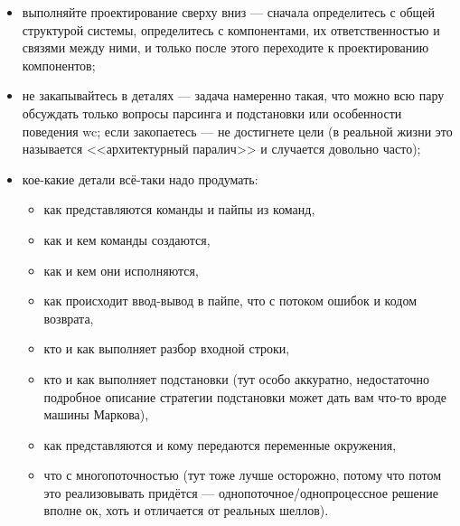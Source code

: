 \documentclass{../../text-style}
\begin{document}
\begin{itemize}
    \item выполняйте проектирование сверху вниз --- сначала определитесь с общей структурой системы, определитесь с компонентами, их ответственностью и связями между ними, и только после этого переходите к проектированию компонентов;
    \item не закапывайтесь в деталях --- задача намеренно такая, что можно всю пару обсуждать только вопросы парсинга и подстановки или особенности поведения wc; если закопаетесь --- не достигнете цели (в реальной жизни это называется <<архитектурный паралич>> и случается довольно часто);
    \item кое-какие детали всё-таки надо продумать:
    \begin{itemize}
        \item как представляются команды и пайпы из команд,
        \item как и кем команды создаются,
        \item как и кем они исполняются,
        \item как происходит ввод-вывод в пайпе, что с потоком ошибок и кодом возврата,
        \item кто и как выполняет разбор входной строки,
        \item кто и как выполняет подстановки (тут особо аккуратно, недостаточно подробное описание стратегии подстановки может дать вам что-то вроде машины Маркова),
        \item как представляются и кому передаются переменные окружения,
        \item что с многопоточностью (тут тоже лучше осторожно, потому что потом это реализовывать придётся --- однопоточное/однопроцессное решение вполне ок, хоть и отличается от реальных шеллов).
    \end{itemize}
\end{itemize}
\end{document}
